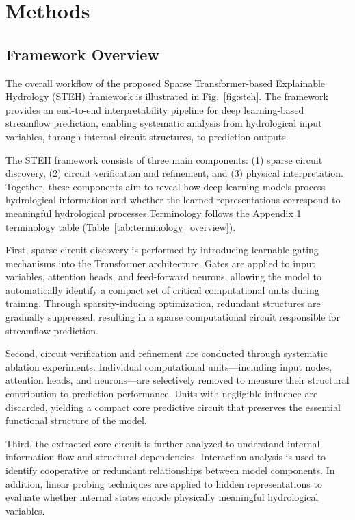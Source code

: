 \section{Methods}

\subsection{Framework Overview}

The overall workflow of the proposed Sparse Transformer-based Explainable Hydrology (STEH) framework is illustrated in Fig.~\ref{fig:steh}. The framework provides an end-to-end interpretability pipeline for deep learning-based streamflow prediction, enabling systematic analysis from hydrological input variables, through internal circuit structures, to prediction outputs.

The STEH framework consists of three main components: (1) sparse circuit discovery, (2) circuit verification and refinement, and (3) physical interpretation. Together, these components aim to reveal how deep learning models process hydrological information and whether the learned representations correspond to meaningful hydrological processes.Terminology follows the Appendix 1 terminology table (Table~\ref{tab:terminology_overview}).

First, sparse circuit discovery is performed by introducing learnable gating mechanisms into the Transformer architecture. Gates are applied to input variables, attention heads, and feed-forward neurons, allowing the model to automatically identify a compact set of critical computational units during training. Through sparsity-inducing optimization, redundant structures are gradually suppressed, resulting in a sparse computational circuit responsible for streamflow prediction.

Second, circuit verification and refinement are conducted through systematic ablation experiments. Individual computational units—including input nodes, attention heads, and neurons—are selectively removed to measure their structural contribution to prediction performance. Units with negligible influence are discarded, yielding a compact core predictive circuit that preserves the essential functional structure of the model.

Third, the extracted core circuit is further analyzed to understand internal information flow and structural dependencies. Interaction analysis is used to identify cooperative or redundant relationships between model components. In addition, linear probing techniques are applied to hidden representations to evaluate whether internal states encode physically meaningful hydrological variables.

